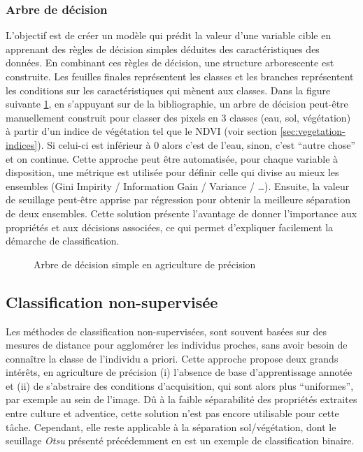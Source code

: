 \documentclass[../thesis.tex]{subfiles}
\begin{document}
    
    \subsubsection{Arbre de décision} L'objectif est de créer un modèle qui prédit la valeur d'une variable cible en apprenant des règles de décision simples déduites des caractéristiques des données. En combinant ces règles de décision, une structure arborescente est construite. Les feuilles finales représentent les classes et les branches représentent les conditions sur les caractéristiques qui mènent aux classes. Dans la figure suivante \ref{fig:03-classification-decision-tree}, en s'appuyant sur de la bibliographie, un arbre de décision peut-être manuellement construit pour classer des pixels en 3 classes (eau, sol, végétation) à partir d'un indice de végétation tel que le NDVI (voir section \ref{sec:vegetation-indices}). Si celui-ci est inférieur à 0 alors c'est de l'eau, sinon, c'est ``autre chose'' et on continue. Cette approche peut être automatisée, pour chaque variable à disposition, une métrique est utilisée pour définir celle qui divise au mieux les ensembles (Gini Impirity / Information Gain / Variance / \dots). Ensuite, la valeur de seuillage peut-être apprise par régression pour obtenir la meilleure séparation de deux ensembles. Cette solution présente l'avantage de donner l'importance aux propriétés et aux décisions associées, ce qui permet d'expliquer facilement la démarche de classification.
    
    \begin{figure}[H]
        \centering
        
        \caption{Arbre de décision simple en agriculture de précision}
        \label{fig:03-classification-decision-tree}
    \end{figure}
    
    \newpage
    \subsection{Classification non-supervisée}
    
    Les méthodes de classification non-supervisées, sont souvent basées sur des mesures de distance pour agglomérer les individus proches, sans avoir besoin de connaître la classe de l'individu a priori. Cette approche propose deux grands intérêts, en agriculture de précision (i) l'absence de base d'apprentissage annotée et (ii) de s'abstraire des conditions d'acquisition, qui sont alors plus ``uniformes'', par exemple au sein de l'image. Dû à la faible séparabilité des propriétés extraites entre culture et adventice, cette solution n'est pas encore utilisable pour cette tâche. Cependant, elle reste applicable à la séparation sol/végétation, dont le seuillage \textit{Otsu} présenté précédemment en est un exemple de classification binaire.
    
\end{document}
